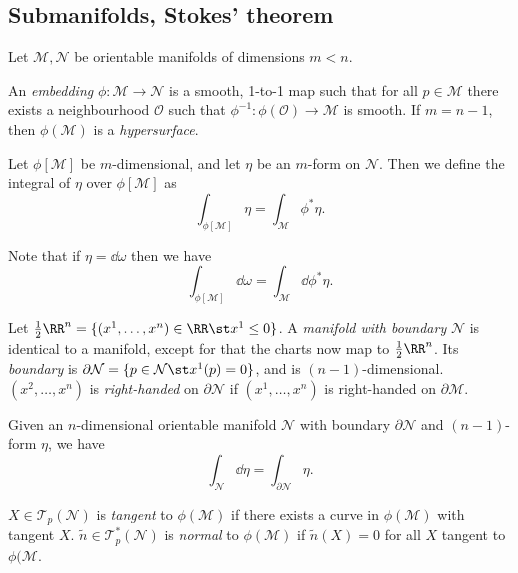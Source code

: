 \documentclass{jknotes}
\begin{document}
\subsection{Submanifolds, Stokes' theorem}
Let \(\mathcal{M},\mathcal{N}\) be orientable manifolds of dimensions \(m<n\).
\begin{defn}
    An \emph{embedding} \(\phi:\mathcal{M}\to\mathcal{N}\) is a smooth, 1-to-1 map such that for all \(p\in\mathcal{M}\) there exists a neighbourhood \(\mathcal{O}\) such that \(\phi^{-1}:\phi(\mathcal{O})\to\mathcal{M}\) is smooth. If \(m=n-1\), then \(\phi(\mathcal{M})\) is a \emph{hypersurface}.
\end{defn}
\begin{defn}
    Let \(\phi[\mathcal{M}]\) be \(m\)-dimensional, and let \(\eta\) be an \(m\)-form on \(\mathcal{N}\). Then we define the integral of \(\eta\) over \(\phi[\mathcal{M}]\) as
    \begin{equation}
        \int_{\phi[\mathcal{M}]}\eta = \int_{\mathcal{M}}\phi^*\eta.
    \end{equation}
\end{defn}
Note that if \(\eta = \dd{\omega}\) then we have
\begin{equation}
    \int_{\phi[\mathcal{M}]}\dd{\omega} = \int_{\mathcal{M}}\dd{\phi^*\eta}.
\end{equation}
\begin{defn}
    Let \(\frac12\RR^n=\{(x^1,\dots,x^n)\in\RR\st x^1\le0\}\). A \emph{manifold with boundary} \(\mathcal{N}\) is identical to a manifold, except for that the charts now map to \(\frac12\RR^n\). Its \emph{boundary} is \(\partial\mathcal{N}=\{p\in\mathcal{N} \st x^1(p) = 0\}\), and is \((n-1)\)-dimensional. \((x^2,\dots,x^n)\) is \emph{right-handed} on \(\partial\mathcal{N}\) if \((x^1,\dots,x^n)\) is right-handed on \(\partial\mathcal{M}\).
\end{defn}

\begin{theorem}
    Given an \(n\)-dimensional orientable manifold \(\mathcal{N}\) with boundary \(\partial\mathcal{N}\) and \((n-1)\)-form \(\eta\), we have
    \begin{equation}
        \int_{\mathcal{N}} \dd{\eta} = \int_{\partial\mathcal{N}} \eta.
    \end{equation}
\end{theorem}

\begin{defn}
    \(X\in\mathcal{T}_p(\mathcal{N})\) is \emph{tangent} to \(\phi(\mathcal{M})\) if there exists a curve in \(\phi(\mathcal{M})\) with tangent \(X\). \(\tilde{n}\in\mathcal{T}_p^*(\mathcal{N})\) is \emph{normal} to \(\phi(\mathcal{M})\) if \(\tilde{n}(X) = 0\) for all \(X\) tangent to \(\phi(\mathcal{M}\).
\end{defn}
\end{document}
